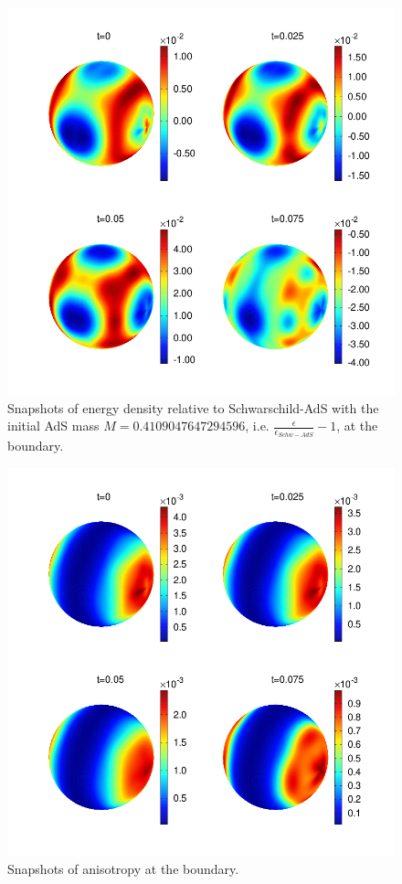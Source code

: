 \documentclass[12pt]{iopart} %
\begin{document}
\begin{figure}[h]
        \centering
        \includegraphics[width=5.0in,clip=true]{plots/bdyplots/L3/bdyenergydensityrelativetoschw/sphereplots_bdyenergydensityrelativetoschw_L3_2by2.png}
\parbox{5.0in}{\caption{Snapshots of energy density relative to Schwarschild-AdS with the initial AdS mass $M=0.4109047647294596$, i.e. $\frac{\epsilon}{\epsilon_{Schw-AdS}}-1$, at the boundary.
        }\label{fig:snapshotsenergydensity}}
\end{figure}

\begin{figure}[h]
        \centering
        \includegraphics[width=5.0in,clip=true]{plots/bdyplots/L3/bdyanisotropy/sphereplots_bdyanisotropy_L3_2by2.png}
\parbox{5.0in}{\caption{Snapshots of anisotropy at the boundary.
        }\label{fig:snapshotsbdyphi}}
\end{figure}
\end{document}
